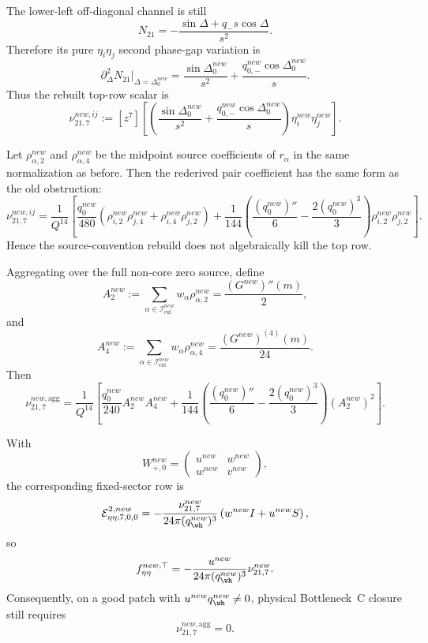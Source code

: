\documentclass[11pt,a4paper]{amsart}
\def\new{new}%
\theoremstyle{plain}
\theoremstyle{definition}
\newcommand{\new}{\mathrm{new}}
\begin{document}
The lower-left off-diagonal channel is still
\[
N_{21}
=
-\frac{\sin\Delta+q_-s\cos\Delta}{s^2}.
\]
Therefore its pure \(\eta_i\eta_j\) second phase-gap variation is
\[
\partial_\Delta^2N_{21}\big|_{\Delta=\Delta_0^{\new}}
=
\frac{\sin\Delta_0^{\new}}{s^2}
+
\frac{q_{0,-}^{\new}\cos\Delta_0^{\new}}{s}.
\]
Thus the rebuilt top-row scalar is
\[
\nu_{21,7}^{\new,ij}
:=
[z^7]\left[
\left(
\frac{\sin\Delta_0^{\new}}{s^2}
+
\frac{q_{0,-}^{\new}\cos\Delta_0^{\new}}{s}
\right)
\eta_i^{\new}\eta_j^{\new}
\right].
\]

Let \(\rho_{\alpha,2}^{\new}\) and \(\rho_{\alpha,4}^{\new}\) be the midpoint
source coefficients of \(r_\alpha\) in the same normalization as before.  Then
the rederived pair coefficient has the same form as the old obstruction:
\[
\boxed{
\nu_{21,7}^{\new,ij}
=
\frac{1}{Q^{14}}
\left[
\frac{q_0^{\new}}{480}
\left(
\rho_{i,2}^{\new}\rho_{j,4}^{\new}
+
\rho_{i,4}^{\new}\rho_{j,2}^{\new}
\right)
+
\frac{1}{144}
\left(
\frac{(q_0^{\new})''}{6}
-
\frac{2(q_0^{\new})^3}{3}
\right)
\rho_{i,2}^{\new}\rho_{j,2}^{\new}
\right].
}
\]
Hence the source-convention rebuild does not algebraically kill the top row.

Aggregating over the full non-core zero source, define
\[
A_2^{\new}
:=
\sum_{\alpha\in\mathcal I_{\mathrm{ext}}^{\new}}
w_\alpha\rho_{\alpha,2}^{\new}
=
\frac{(G^{\new})''(m)}{2},
\]
and
\[
A_4^{\new}
:=
\sum_{\alpha\in\mathcal I_{\mathrm{ext}}^{\new}}
w_\alpha\rho_{\alpha,4}^{\new}
=
\frac{(G^{\new})^{(4)}(m)}{24}.
\]
Then
\[
\boxed{
\nu_{21,7}^{\new,\mathrm{agg}}
=
\frac{1}{Q^{14}}
\left[
\frac{q_0^{\new}}{240}A_2^{\new}A_4^{\new}
+
\frac{1}{144}
\left(
\frac{(q_0^{\new})''}{6}
-
\frac{2(q_0^{\new})^3}{3}
\right)
(A_2^{\new})^2
\right].
}
\]

With
\[
W_{+,0}^{\new}
=
\begin{pmatrix}
u^{\new}&w^{\new}\\
w^{\new}&v^{\new}
\end{pmatrix},
\]
the corresponding fixed-sector row is
\[
\mathcal E_{\eta\eta;7,0,0}^{2,\new}
=
-\frac{\nu_{21,7}^{\new}}{24\pi(q_{\wh}^{\new})^3}
\left(
w^{\new}I+u^{\new}S
\right),
\]
so
\[
f_{\eta\eta}^{\new,\top}
=
-\frac{u^{\new}}{24\pi(q_{\wh}^{\new})^3}
\nu_{21,7}^{\new}.
\]
Consequently, on a good patch with \(u^{\new}q_{\wh}^{\new}\ne0\), physical
Bottleneck~C closure still requires
\[
\nu_{21,7}^{\new,\mathrm{agg}}=0.
\]
\end{document}
